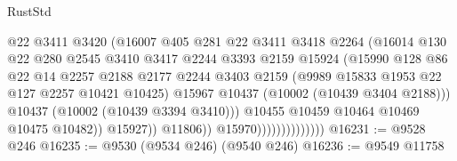 \begin{lexlean}{RustStd}
\begin{coremodule}
                                          @22
                                          @3411
                                          @3420
                                          (@16007
                                            @405
                                            @281
                                            @22
                                            @3411
                                            @3418
                                            @2264
                                            (@16014
                                              @130
                                              @22
                                              @280
                                              @2545
                                              @3410
                                              @3417
                                              @2244
                                              @3393
                                              @2159
                                              @15924
                                              (@15990
                                                @128
                                                @86
                                                @22
                                                @14
                                                @2257
                                                @2188
                                                @2177
                                                @2244
                                                @3403
                                                @2159
                                                (@9989 @15833 @1953 @22 @127 @2257 @10421 @10425)
                                                @15967
                                                @10437
                                                (@10002 (@10439 @3404 @2188)))
                                              @10437
                                              (@10002 (@10439 @3394 @3410)))
                                            @10455
                                            @10459
                                            @10464
                                            @10469
                                            @10475
                                            @10482))
                                        @15927))
                                    @11806))
                                @15970))))))))))))))
@16231 := @9528 @246
@16235 := @9530 (@9534 @246) (@9540 @246)
@16236 := @9549 @11758

\end{coremodule}
\end{lexlean}
